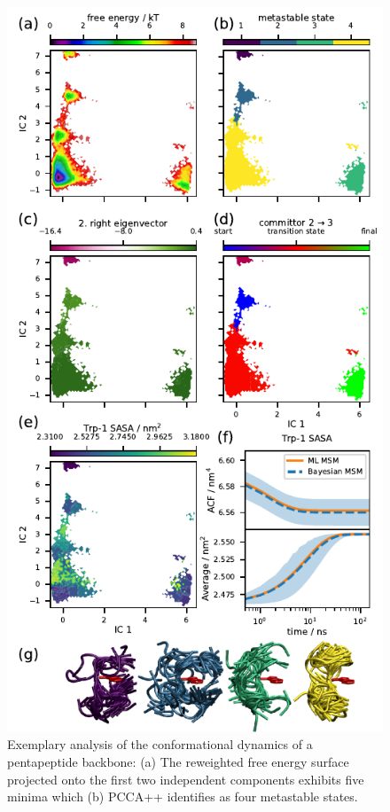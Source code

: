 \documentclass[9pt,tutorial]{livecoms}
\begin{document}
\begin{figure}
\includegraphics{figure_3}
\caption{Exemplary analysis of the conformational dynamics of a pentapeptide backbone:
(a) The reweighted free energy surface projected onto the first two independent components exhibits five minima which
(b) PCCA++ identifies as four metastable states.
}
\end{figure}
\end{document}
